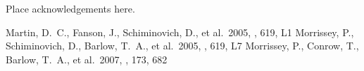 \documentclass[preprint]{aastex}
\begin{document}
\acknowledgements
Place acknowledgements here.

\begin{thebibliography}{}
 Martin, D.~C., Fanson, J., Schiminovich, D., et al.\ 2005, \apjl, 619, L1
 Morrissey, P., Schiminovich, D., Barlow, T.~A., et al.\ 2005, \apjl, 619, L7
 Morrissey, P., Conrow, T., Barlow, T.~A., et al.\ 2007, \apjs, 173, 682
\end{thebibliography}


\clearpage




\clearpage

\end{document}
